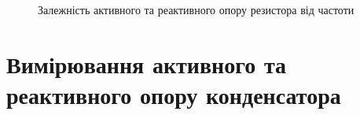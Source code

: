 \begin{figure}[h]
    \begin{minipage}[h]{0.47\linewidth}
         \\
    \end{minipage}
    \hfill
    \begin{minipage}[h]{0.47\linewidth}
        \\
    \end{minipage}
    \caption{Залежність активного та реактивного опору резистора від частоти}
    \label{fig:part21}
\end{figure}


\section{Вимірювання активного та реактивного опору конденсатора}

